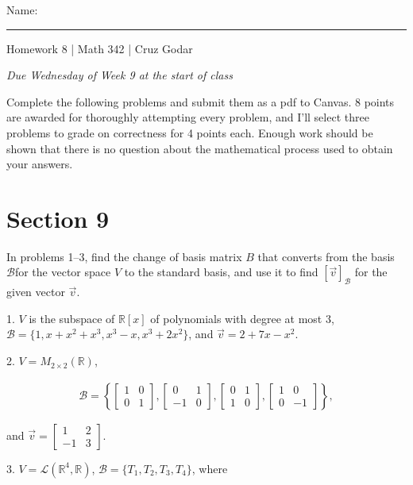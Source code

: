 \documentclass{article}
\begin{document}
\Large Name: \rule{2in}{0.15mm} \hfill Homework 8 | Math 342 | Cruz Godar \vspace{4pt} \normalsize

\textit{Due Wednesday of Week 9 at the start of class}

Complete the following problems and submit them as a pdf to Canvas. 8 points are awarded for thoroughly attempting every problem, and I'll select three problems to grade on correctness for 4 points each. Enough work should be shown that there is no question about the mathematical process used to obtain your answers.

\section{Section 9}

In problems 1--3, find the change of basis matrix $B$ that converts from the basis $\mathcal{B}$for the vector space $V$ to the standard basis, and use it to find $[\vec{v}]_\mathcal{B}$ for the given vector $\vec{v}$.

1. $V$ is the subspace of $\mathbb{R}[x]$ of polynomials with degree at most $3$, $\mathcal{B} = \{1, x + x^2 + x^3, x^3 - x, x^3 + 2x^2\}$, and $\vec{v} = 2 + 7x - x^2$.

2. $V = M_{2 \times 2}(\mathbb{R})$,

\begin{align*}
	\mathcal{B} = \left\{ \left[\begin{array}{cc} 1& 0 \\ 0& 1 \end{array}\right], \left[\begin{array}{cc} 0& 1 \\ -1& 0 \end{array}\right], \left[\begin{array}{cc} 0& 1 \\ 1& 0 \end{array}\right], \left[\begin{array}{cc} 1& 0 \\ 0& -1 \end{array}\right] \right\},
\end{align*}

and $\vec{v} = \left[\begin{array}{cc} 1& 2 \\ -1& 3 \end{array}\right]$.

3. $V = \mathcal{L}(\mathbb{R}^4, \mathbb{R})$, $\mathcal{B} = \{T_1, T_2, T_3, T_4\}$, where
\end{document}

